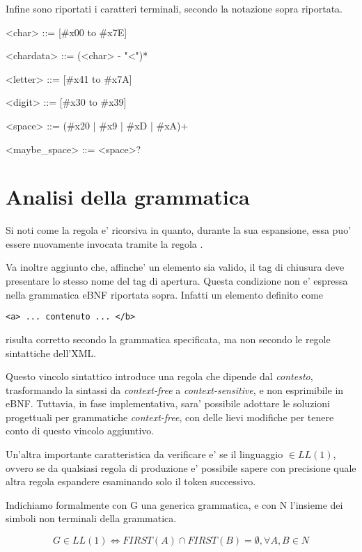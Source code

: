 \documentclass[italian,a4paper]{article}
\begin{document}
Infine sono riportati i caratteri terminali, secondo la notazione sopra
riportata.

\begin{grammar}
	<char> ::= [\#x00 to \#x7E]

	<chardata> ::= (<char> - "<")*

	<letter> ::= [\#x41 to \#x7A]

	<digit> ::= [\#x30 to \#x39]

	<space> ::= (\#x20 | \#x9 | \#xD | \#xA)+

	<maybe\_space> ::= <space>?
\end{grammar}

\section{Analisi della grammatica}

Si noti come la regola  e' ricorsiva in quanto, durante la sua
espansione, essa puo' essere nuovamente invocata tramite la regola
.

Va inoltre aggiunto che, affinche' un elemento sia valido, il tag di chiusura
deve presentare lo stesso nome del tag di apertura. Questa condizione non e'
espressa nella grammatica eBNF riportata sopra. Infatti un elemento definito
come

\begin{verbatim}
<a> ... contenuto ... </b>
\end{verbatim}

risulta corretto secondo la grammatica specificata, ma non secondo le regole
sintattiche dell'XML.

Questo vincolo sintattico introduce una regola che dipende dal \emph{contesto},
trasformando la sintassi da \emph{context-free} a \emph{context-sensitive}, e
non esprimibile in eBNF. Tuttavia, in fase implementativa, sara' possibile
adottare le soluzioni progettuali per grammatiche \emph{context-free}, con delle
lievi modifiche per tenere conto di questo vincolo aggiuntivo.

Un'altra importante caratteristica da verificare e' se il linguaggio $ \in LL(1)
$, ovvero se da qualsiasi regola di produzione e' possibile sapere con
precisione quale altra regola espandere esaminando solo il token successivo.

Indichiamo formalmente con G una generica grammatica, e con N l'insieme dei
simboli non terminali della grammatica.

\[ G \in LL(1) \iff FIRST(A) \cap FIRST(B) = \emptyset, \forall A, B \in N \]
\end{document}
